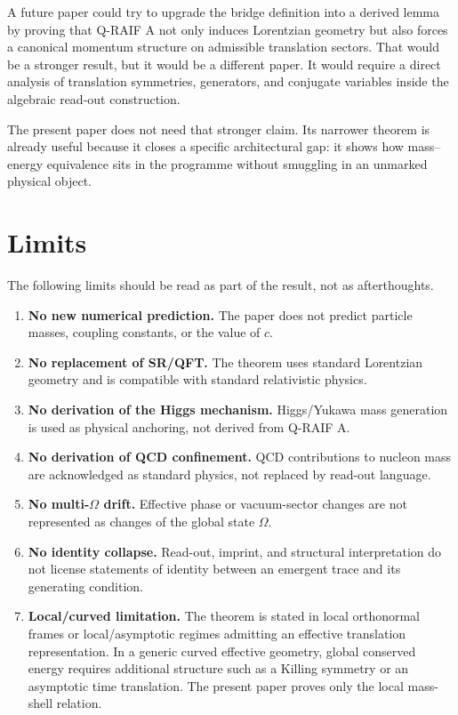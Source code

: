 \documentclass[12pt,a4paper]{article}
\theoremstyle{definition}
\theoremstyle{remark}
\newcommand{\Omegastate}{\Omega}
\begin{document}
A future paper could try to upgrade the bridge definition into a derived lemma by proving that Q-RAIF A not only induces Lorentzian geometry but also forces a canonical momentum structure on admissible translation sectors. That would be a stronger result, but it would be a different paper. It would require a direct analysis of translation symmetries, generators, and conjugate variables inside the algebraic read-out construction.

The present paper does not need that stronger claim. Its narrower theorem is already useful because it closes a specific architectural gap: it shows how mass--energy equivalence sits in the programme without smuggling in an unmarked physical object.

\section{Limits}
\label{sec:limits}

The following limits should be read as part of the result, not as afterthoughts.

\begin{enumerate}[leftmargin=*]
\item \textbf{No new numerical prediction.} The paper does not predict particle masses, coupling constants, or the value of $c$.
\item \textbf{No replacement of SR/QFT.} The theorem uses standard Lorentzian geometry and is compatible with standard relativistic physics.
\item \textbf{No derivation of the Higgs mechanism.} Higgs/Yukawa mass generation is used as physical anchoring, not derived from Q-RAIF A.
\item \textbf{No derivation of QCD confinement.} QCD contributions to nucleon mass are acknowledged as standard physics, not replaced by read-out language.
\item \textbf{No multi-$\Omegastate$ drift.} Effective phase or vacuum-sector changes are not represented as changes of the global state $\Omegastate$.
\item \textbf{No identity collapse.} Read-out, imprint, and structural interpretation do not license statements of identity between an emergent trace and its generating condition.
\item \textbf{Local/curved limitation.} The theorem is stated in local orthonormal frames or local/asymptotic regimes admitting an effective translation representation. In a generic curved effective geometry, global conserved energy requires additional structure such as a Killing symmetry or an asymptotic time translation. The present paper proves only the local mass-shell relation.
\end{enumerate}
\end{document}
